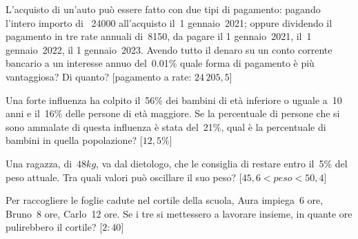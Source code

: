 \begin{multicols}{2}
\begin{esercizio}
L'acquisto di un'auto può essere fatto con due tipi di pagamento: pagando
l'intero importo di \officialeuro\ 24000 all'acquisto il~1{\textdegree} 
gennaio~2021; oppure
dividendo il pagamento in tre rate annuali di~8150, da pagare il
1{\textdegree} gennaio~2021, il~1{\textdegree} gennaio~2022, il
1{\textdegree} gennaio~2023. Avendo tutto il denaro su un conto
corrente bancario a un interesse annuo del~0.01\% quale forma di pagamento
è più vantaggiosa? Di quanto?
\hfill [pagamento a rate: \(24\,205,5\)]
\end{esercizio}

\begin{esercizio}
Una forte influenza ha colpito il~56\% dei bambini di età
inferiore o uguale a~10 anni e il~16\% delle persone di età maggiore.
Se la percentuale di persone che si sono ammalate di questa influenza
è stata del~21\%, qual è la percentuale di bambini in quella
popolazione?
\phantom{.}\hfill [\(12,5\%\)]
\end{esercizio}

\begin{esercizio}
Una ragazza, di~\(48\unit{kg}\), va dal dietologo, che
le consiglia di restare entro il~5\% del peso attuale. Tra
quali valori può oscillare il suo peso?
\hfill [\(45,6 < peso < 50,4\)]
\end{esercizio}

\begin{esercizio}
Per raccogliere le foglie cadute nel cortile
della scuola, Aura impiega~6 ore, Bruno~8 ore,
Carlo~12 ore. Se i tre si mettessero a lavorare
insieme, in quante ore pulirebbero il cortile?
\hfill [\(2\!:\!40\)]
\end{esercizio}

\begin{comment}
% 
% 


\end{comment}
\end{multicols}
